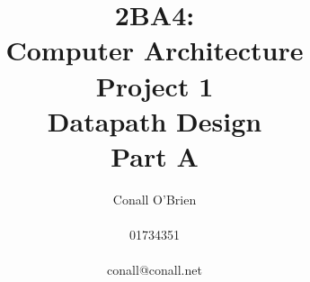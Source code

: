\documentclass[a4paper,12pt]{article}
\begin{document}
\title{2BA4: \\ Computer Architecture \\ Project 1 \\ Datapath Design \\ Part A}

\author{Conall O'Brien \\ \\ 01734351 \\ \\ conall@conall.net}

\maketitle

\pagebreak
\end{document}

